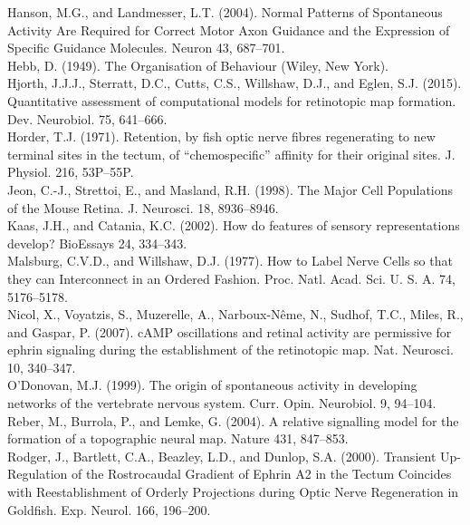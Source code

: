 \documentclass[11pt]{"article"}
\begin{document}
{Hanson, M.G., and Landmesser, L.T. (2004). Normal Patterns of Spontaneous Activity Are Required for Correct Motor Axon Guidance and the Expression of Specific Guidance Molecules. Neuron 43, 687–701. \\

Hebb, D. (1949). The Organisation of Behaviour (Wiley, New York). \\

Hjorth, J.J.J., Sterratt, D.C., Cutts, C.S., Willshaw, D.J., and Eglen, S.J. (2015). Quantitative assessment of computational models for retinotopic map formation. Dev. Neurobiol. 75, 641–666. \\

Horder, T.J. (1971). Retention, by fish optic nerve fibres regenerating to new terminal sites in the tectum, of “chemospecific” affinity for their original sites. J. Physiol. 216, 53P–55P. \\

Jeon, C.-J., Strettoi, E., and Masland, R.H. (1998). The Major Cell Populations of the Mouse Retina. J. Neurosci. 18, 8936–8946. \\

Kaas, J.H., and Catania, K.C. (2002). How do features of sensory representations develop? BioEssays 24, 334–343. \\

Malsburg, C.V.D., and Willshaw, D.J. (1977). How to Label Nerve Cells so that they can Interconnect in an Ordered Fashion. Proc. Natl. Acad. Sci. U. S. A. 74, 5176–5178. \\

Nicol, X., Voyatzis, S., Muzerelle, A., Narboux-Nême, N., Sudhof, T.C., Miles, R., and Gaspar, P. (2007). cAMP oscillations and retinal activity are permissive for ephrin signaling during the establishment of the retinotopic map. Nat. Neurosci. 10, 340–347. \\

O'Donovan, M.J. (1999). The origin of spontaneous activity in developing networks of the vertebrate nervous system. Curr. Opin. Neurobiol. 9, 94–104. \\

Reber, M., Burrola, P., and Lemke, G. (2004). A relative signalling model for the formation of a topographic neural map. Nature 431, 847–853. \\

Rodger, J., Bartlett, C.A., Beazley, L.D., and Dunlop, S.A. (2000). Transient Up-Regulation of the Rostrocaudal Gradient of Ephrin A2 in the Tectum Coincides with Reestablishment of Orderly Projections during Optic Nerve Regeneration in Goldfish. Exp. Neurol. 166, 196–200. \\

}
\end{document}
